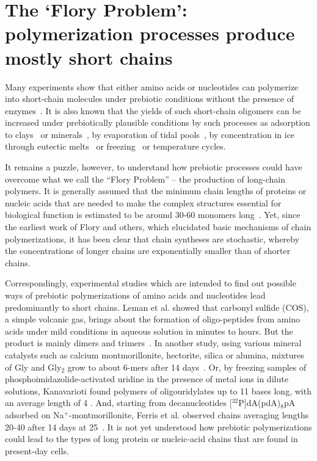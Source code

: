 \documentclass[journal=jacsat,manuscript=article,layout=twocolumn]{achemso}
\begin{document}
 \section{The `Flory Problem': polymerization processes produce mostly short chains}
 \label{sec:flory} 

Many experiments show that either amino acids or nucleotides can polymerize into 
short-chain molecules under prebiotic conditions without the presence of 
enzymes~\cite{Shock1992,Martin1998,PAECHT-HOROWITZ1970,Leman2004a,Orgel2004}.  It is also known 
that 
the yields of such short-chain oligomers can be increased under prebiotically plausible conditions 
by such processes as adsorption to clays~\cite{Rao1980,Lambert2008} or 
minerals~\cite{Bernal1949,Ferris1996}, by evaporation of tidal pools~\cite{Nelson2001}, by 
concentration in ice through eutectic melts~\cite{Kanavarioti2001} or freezing~\cite{Bada2004} or 
temperature cycles. 

It remains a puzzle, however, to understand how prebiotic processes could have overcome what 
we call the ``Flory Problem'' -- the production of long-chain polymers.  It is generally assumed 
that the minimum chain lengths of proteins or nucleic acids that are needed to make the complex 
structures essential for biological function is estimated to be around 30-60 monomers 
long~\cite{Szostak1993}.  Yet, since the earliest work of Flory and others, which elucidated basic 
mechanisms of chain polymerizations, it has been clear that chain syntheses are stochastic, whereby 
the concentrations of longer chains are exponentially smaller than of shorter chains. 

Correspondingly, experimental studies which are intended to find out possible ways of prebiotic 
polymerizations of amino acids and nucleotides lead predominantly to short chains. Leman et al. 
showed that carbonyl sulfide (COS), a simple volcanic gas, brings about the formation of 
oligo-peptides from amino acids under mild conditions in aqueous solution in minutes to hours. But 
the product is mainly dimers and trimers~\cite{Leman2004a}.  In another study, using various 
mineral 
catalysts such as calcium montmorillonite, hectorite, silica or alumina, mixtures of Gly and 
Gly$_2$ 
grow to about 6-mers after 14 days~\cite{Rode1997,Rode1999}.  Or, by freezing samples of 
phosphoimidazolide-activated uridine in the presence of metal ions in dilute solutions, Kanavarioti 
found polymers of oligouridylates up to 11 bases long, with an average length of 4 
\cite{Kanavarioti2001}.  And, starting from decanucleotides [$^{32}$P]dA(pdA)$_8$pA adsorbed on 
Na$^+$-montmorillonite, Ferris et al. observed chains averaging lengths 20-40 after 14 days at 
25\textcelsius\ \cite{Ferris1996}.  It is not yet understood how prebiotic polymerizations could 
lead to the types of long protein or nucleic-acid chains that are found in present-day cells.
\end{document}
